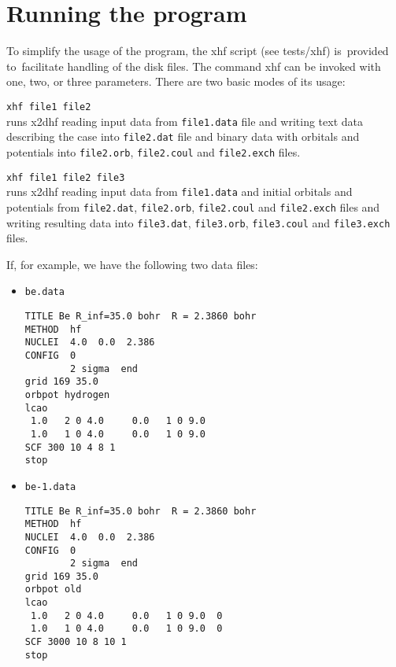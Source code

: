 \documentclass[10pt,a4paper]{article}
\begin{document}
\newpage

\section{Running the program}

\noindent
To simplify the usage of the program, the xhf script (see tests/xhf)
is~provided to~facilitate handling of the disk files.  The command xhf can
be invoked with one, two, or three parameters. There are two basic modes of
its usage:

\begin{description}
\item \hspace*{0.5cm} \texttt{xhf file1 file2}\\ runs x2dhf reading
  input data from \texttt{file1.data} file and writing text data
  describing the case into \texttt{file2.dat} file and binary data
  with orbitals and potentials into \texttt{file2.orb},
  \texttt{file2.coul} and \texttt{file2.exch} files.
\end{description}


\begin{description}
\item \hspace*{0.5cm} \texttt{xhf file1 file2 file3}\\ runs x2dhf
  reading input data from \texttt{file1.data} and initial orbitals and
  potentials from \texttt{file2.dat}, \texttt{file2.orb},
  \texttt{file2.coul} and \texttt{file2.exch} files and writing
  resulting data into \texttt{file3.dat}, \texttt{file3.orb},
  \texttt{file3.coul} and \texttt{file3.exch} files.
\end{description}

If, for example, we have the following two data files:
\begin{itemize} 
\item \texttt{be.data}
{\fontsize{10}{10}\selectfont   
\begin{verbatim}
TITLE Be R_inf=35.0 bohr  R = 2.3860 bohr
METHOD  hf
NUCLEI  4.0  0.0  2.386  
CONFIG  0
        2 sigma  end
grid 169 35.0   
orbpot hydrogen
lcao
 1.0   2 0 4.0     0.0   1 0 9.0    
 1.0   1 0 4.0     0.0   1 0 9.0    
SCF 300 10 4 8 1
stop
\end{verbatim}
}

  
\item \texttt{be-1.data} 
{\fontsize{10}{10}\selectfont 
\begin{verbatim}
TITLE Be R_inf=35.0 bohr  R = 2.3860 bohr
METHOD  hf 
NUCLEI  4.0  0.0  2.386  
CONFIG  0
        2 sigma  end
grid 169 35.0   
orbpot old
lcao
 1.0   2 0 4.0     0.0   1 0 9.0  0  
 1.0   1 0 4.0     0.0   1 0 9.0  0  
SCF 3000 10 8 10 1
stop
\end{verbatim}
}
\end{itemize}   
\end{document}
